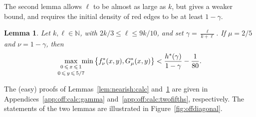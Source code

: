 \documentclass[12pt,reqno]{amsart}
\newtheorem{lemma}[theorem]{Lemma}
\theoremstyle{definition}
\theoremstyle{remark}
\newcommand\N{\mathbb{N}}
\renewcommand{\le}{\leqslant}
\def\N{\mathbb{N}}
\begin{document}
The second lemma allows $\ell$ to be almost as large as $k$, but gives a weaker bound, and requires the initial density of red edges to be at least $1 - \gamma$.

\begin{lemma}\label{lem:even:nearer:calc}
Let $k,\ell \in \N$, with $2k/3 \le \ell \le 9k/10$, and set $\gamma = \frac{\ell}{k+\ell}$. If\/ $\mu = 2/5$ and $\nu = 1 - \gamma$, then
$$\max_{\substack{\\[-0.05ex] 0 \,\le\, x \,\le\, 1 \\[+0.3ex] 0 \,\le\, y \,\le\, 5/7}} \hspace{-0.2cm} \min \big\{ f^*_\nu (x,y),G^*_\mu(x,y) \big\} < \frac{h^*(\gamma)}{1-\gamma} - \frac{1}{80}.$$
\end{lemma}

The (easy) proofs of Lemmas~\ref{lem:nearish:calc} and~\ref{lem:even:nearer:calc} are given in Appendices~\ref{app:off:calc:gamma} and~\ref{app:off:calc:twofifths}, respectively. The statements of the two lemmas are illustrated in Figure~\ref{fig:offdiagonal}. 

\pagebreak
\end{document}
